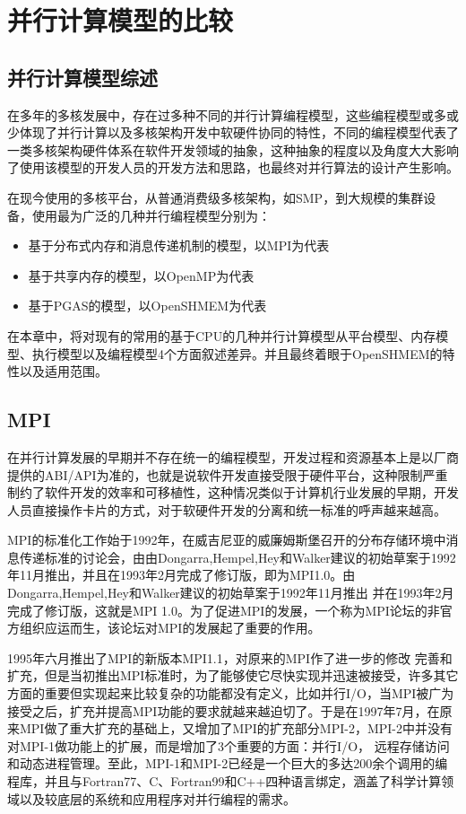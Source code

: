 \chapter{并行计算模型的比较}
\label{chap:model-cmp}
\section{并行计算模型综述}
在多年的多核发展中，存在过多种不同的并行计算编程模型，这些编程模型或多或少体现了并行计算以及多核架构开发中软硬件协同的特性，不同的编程模型代表了一类多核架构硬件体系在软件开发领域的抽象，这种抽象的程度以及角度大大影响了使用该模型的开发人员的开发方法和思路，也最终对并行算法的设计产生影响。

在现今使用的多核平台，从普通消费级多核架构，如SMP，到大规模的集群设备，使用最为广泛的几种并行编程模型分别为：
\begin{itemize}
\item 基于分布式内存和消息传递机制的模型，以MPI为代表
\item 基于共享内存的模型，以OpenMP为代表
\item 基于PGAS的模型，以OpenSHMEM为代表
\end{itemize}
在本章中，将对现有的常用的基于CPU的几种并行计算模型从平台模型、内存模型、执行模型以及编程模型4个方面叙述差异。并且最终着眼于OpenSHMEM的特性以及适用范围。
\section{MPI}
在并行计算发展的早期并不存在统一的编程模型，开发过程和资源基本上是以厂商提供的ABI/API为准的，也就是说软件开发直接受限于硬件平台，这种限制严重制约了软件开发的效率和可移植性，这种情况类似于计算机行业发展的早期，开发人员直接操作卡片的方式，对于软硬件开发的分离和统一标准的呼声越来越高。

MPI的标准化工作始于1992年，在威吉尼亚的威廉姆斯堡召开的分布存储环境中消息传递标准的讨论会，由由Dongarra,Hempel,Hey和Walker建议的初始草案于1992年11月推出，并且在1993年2月完成了修订版，即为MPI1.0。由Dongarra,Hempel,Hey和Walker建议的初始草案于1992年11月推出 并在1993年2月完成了修订版，这就是MPI 1.0。为了促进MPI的发展，一个称为MPI论坛的非官方组织应运而生，该论坛对MPI的发展起了重要的作用。

1995年六月推出了MPI的新版本MPI1.1，对原来的MPI作了进一步的修改 完善和扩充，但是当初推出MPI标准时，为了能够使它尽快实现并迅速被接受，许多其它方面的重要但实现起来比较复杂的功能都没有定义，比如并行I/O，当MPI被广为接受之后，扩充并提高MPI功能的要求就越来越迫切了。于是在1997年7月，在原来MPI做了重大扩充的基础上，又增加了MPI的扩充部分MPI-2，MPI-2中并没有对MPI-1做功能上的扩展，而是增加了3个重要的方面：并行I/O， 远程存储访问和动态进程管理。至此，MPI-1和MPI-2已经是一个巨大的多达200余个调用的编程库，并且与Fortran77、C、Fortran99和C++四种语言绑定，涵盖了科学计算领域以及较底层的系统和应用程序对并行编程的需求。


